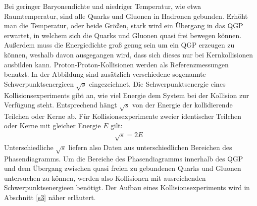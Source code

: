 Bei geringer Baryonendichte und niedriger Temperatur, wie etwa Raumtemperatur, sind alle Quarks und Gluonen in Hadronen gebunden.
Erh\"oht man die Temperatur, oder beide Gr\"o{\ss}en, stark wird ein \"Ubergang in das QGP erwartet, in welchem sich die Quarks und Gluonen quasi frei bewegen k\"onnen.
Au{\ss}erdem muss die Energiedichte gro{\ss} genug sein um ein QGP erzeugen zu k\"onnen, weshalb davon ausgegangen wird, dass sich dieses nur bei Kernkollisionen ausbilden kann.
Proton-Proton-Kollisionen werden als Referenzmessungen benutzt.
\newline
In der Abbildung sind zus\"atzlich verschiedene sogenannte Schwerpunktsenergieen $\sqrt{s}$ eingezeichnet.
Die Schwerpunktsenergie eines Kollisionsexperiments gibt an, wie viel Energie dem System bei der Kollision zur Verf\"ugung steht.
Entsprechend h\"angt $\sqrt{s}$ von der Energie der kollidierende Teilchen oder Kerne ab.
F\"ur Kollisionsexperimente zweier identischer Teilchen oder Kerne mit gleicher Energie $E$ gilt:
\begin{align}
\sqrt{s} = 2E \label{eq:sqrts}
\end{align}
Unterschiedliche $\sqrt{s}$ liefern also Daten aus unterschiedlichen Bereichen des Phasendiagramms.
Um die Bereiche des Phasendiagramms innerhalb des QGP und dem \"Ubergang zwischen quasi freien zu gebundenen Quarks und Gluonen untersuchen zu k\"onnen, werden also Kollisionen mit ausreichenden Schwerpunktsenergieen ben\"otigt.
Der Aufbau eines Kollisionsexperiments wird in Abschnitt \ref{s3} n\"aher erl\"autert.


